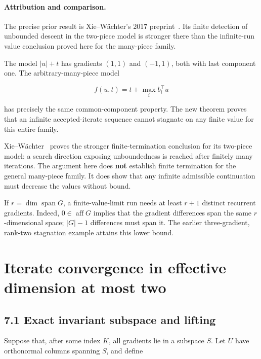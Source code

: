 \paragraph{Attribution and comparison.}
The precise prior result is Xie--W\"achter's 2017 preprint~\cite[Theorem~IV.1]{XW}. Its finite detection of unbounded descent in the two-piece model is stronger there than the infinite-run value conclusion proved here for the many-piece family.


The model \(|u|+t\) has gradients \((1,1)\) and \((-1,1)\), both with
last component one. The arbitrary-many-piece model

\[
f(u,t)=t+\max_i b_i^\top u
\]

has precisely the same common-component property. The new theorem proves
that an infinite accepted-iterate sequence cannot stagnate on any finite
value for this entire family.

Xie--W\"achter~\cite{XW} proves the stronger finite-termination conclusion
for its two-piece model: a search direction exposing unboundedness is
reached after finitely many iterations. The argument here does
\textbf{not} establish finite termination for the general many-piece
family. It does show that any infinite admissible continuation must
decrease the values without bound.

If \(r=\dim\operatorname{span}G\), a finite-value-limit run needs at
least \(r+1\) distinct recurrent gradients. Indeed,
\(0\in\operatorname{aff}G\) implies that the gradient differences span
the same \(r\)-dimensional space; \(|G|-1\) differences must span it.
The earlier three-gradient, rank-two stagnation example attains this
lower bound.


\setcounter{section}{6}
\setcounter{theorem}{0}
\setcounter{lemma}{0}
\setcounter{corollary}{0}
\setcounter{proposition}{0}
\setcounter{remark}{0}
\setcounter{equation}{0}
\section{Iterate convergence in effective dimension at most
two}\label{H:iterate-convergence-in-effective-dimension-at-most-two}

\subsection{7.1 Exact invariant subspace and
lifting}\label{H:exact-invariant-subspace-and-lifting}

Suppose that, after some index \(K\), all gradients lie in a subspace
\(S\). Let \(U\) have orthonormal columns spanning \(S\), and define

